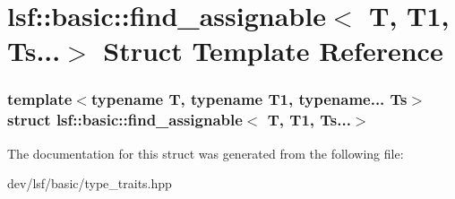 \hypertarget{structlsf_1_1basic_1_1find__assignable_3_01T_00_01T1_00_01Ts_8_8_8_4}{
\section{lsf::basic::find\_\-assignable$<$ T, T1, Ts...$>$ Struct Template Reference}
\label{structlsf_1_1basic_1_1find__assignable_3_01T_00_01T1_00_01Ts_8_8_8_4}
}
\subsubsection*{template$<$typename T, typename T1, typename... Ts$>$ struct lsf::basic::find\_\-assignable$<$ T, T1, Ts...$>$}



The documentation for this struct was generated from the following file:\begin{DoxyCompactItemize}
\item 
dev/lsf/basic/type\_\-traits.hpp\end{DoxyCompactItemize}
